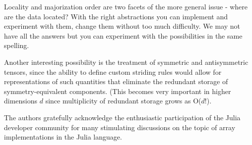 \documentclass[preprint]{sigplanconf}
\begin{document}
Locality and majorization order are two facets of the more general issue -
where are the data located? With the right abstractions you can implement and
experiment with them, change them without too much difficulty. We may not have
all the answers but you can experiment with the possibilities in the same
spelling.

Another interesting possibility is the treatment of symmetric and
antisymmetric tensors, since the ability to define custom striding rules would
allow for representations of such quantities that eliminate the redundant
storage of symmetry-equivalent components. (This becomes very important in
higher dimensions $d$ since multiplicity of redundant storage grows as
O($d!$).



%

\acks

The authors gratefully acknowledge the enthusiastic participation of the Julia
developer community for many stimulating discussions on the topic of array
implementations in the Julia language.



{}





\end{document}
